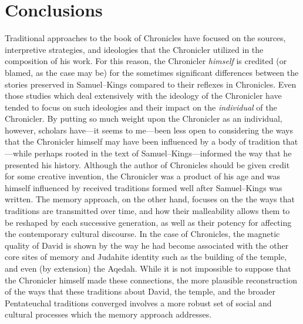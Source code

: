  \hypertarget{conclusions}{%
 \section{Conclusions}\label{conclusions}} 

 Traditional approaches to the book of Chronicles have focused on the sources, interpretive strategies, and ideologies that the Chronicler utilized in the composition of his work. For this reason, the Chronicler \emph{himself} is credited (or blamed, as the case may be) for the sometimes significant differences between the stories preserved in Samuel--Kings compared to their reflexes in Chronicles. Even those studies which deal extensively with the ideology of the Chronicler have tended to focus on such ideologies and their impact on the \emph{individual} of the Chronicler. By putting so much weight upon the Chronicler as an individual, however, scholars have---it seems to me---been less open to considering the ways that the Chronicler himself may have been influenced by a body of tradition that---while perhaps rooted in the text of Samuel--Kings---informed the way that he presented his history. Although the author of Chronicles should be given credit for some creative invention, the Chronicler was a product of his age and was himself influenced by received traditions formed well after Samuel--Kings was written. The memory approach, on the other hand, focuses on the the ways that traditions are transmitted over time, and how their malleability allows them to be reshaped by each successive generation, as well as their potency for affecting the contemporary cultural discourse. In the case of Chronicles, the magnetic quality of David is shown by the way he had become associated with the other core sites of memory and Judahite identity such as the building of the temple, and even (by extension) the Aqedah. While it is not impossible to suppose that the Chronicler himself made these connections, the more plausible reconstruction of the ways that these traditions about David, the temple, and the broader Pentateuchal traditions converged involves a more robust set of social and cultural processes which the memory approach addresses. 